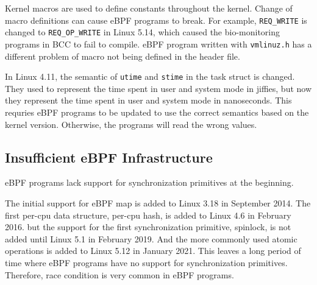 Kernel macros are used to define constants throughout the kernel.
Change of macro definitions can cause eBPF programs to break.
For example, \texttt{REQ\_WRITE} is changed to \texttt{REQ\_OP\_WRITE} in Linux 5.14, which caused the bio-monitoring programs in BCC to fail to compile.
eBPF program written with \texttt{vmlinuz.h} has a different problem of macro not being defined in the header file.


In Linux 4.11, the semantic of \texttt{utime} and \texttt{stime} in the task struct is changed. They used to represent the time spent in user and system mode in jiffies, but now they represent the time spent in user and system mode in nanoseconds. This requries eBPF programs to be updated to use the correct semantics based on the kernel version. Otherwise, the programs will read the wrong values.



\subsection{Insufficient eBPF Infrastructure}

eBPF programs lack support for synchronization primitives at the beginning.

The initial support for eBPF map is added to Linux 3.18 in September 2014.
The first per-cpu data structure, per-cpu hash, is added to Linux 4.6 in February 2016.
but the support for the first synchronization primitive, spinlock, is not added until Linux 5.1 in February 2019. And the more commonly used atomic operations is added to Linux 5.12 in January 2021.
This leaves a long period of time where eBPF programs have no support for synchronization primitives.
Therefore, race condition is very common in eBPF programs. 

